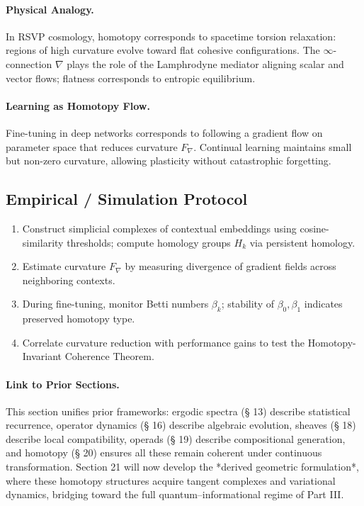 \documentclass[12pt,a4paper,twoside,openright]{book}
\begin{document}
\paragraph{Physical Analogy.}
In RSVP cosmology, homotopy corresponds to spacetime torsion relaxation: regions of high curvature evolve toward flat cohesive configurations.  
The $\infty$-connection $\nabla$ plays the role of the Lamphrodyne mediator aligning scalar and vector flows; flatness corresponds to entropic equilibrium.

\paragraph{Learning as Homotopy Flow.}
Fine-tuning in deep networks corresponds to following a gradient flow on parameter space that reduces curvature $F_\nabla$.  
Continual learning maintains small but non-zero curvature, allowing plasticity without catastrophic forgetting.

\subsection*{Empirical / Simulation Protocol}

\begin{enumerate}
\item Construct simplicial complexes of contextual embeddings using cosine-similarity thresholds; compute homology groups $H_k$ via persistent homology.
\item Estimate curvature $F_\nabla$ by measuring divergence of gradient fields across neighboring contexts.
\item During fine-tuning, monitor Betti numbers $\beta_k$; stability of $\beta_0,\beta_1$ indicates preserved homotopy type.
\item Correlate curvature reduction with performance gains to test the Homotopy-Invariant Coherence Theorem.
\end{enumerate}

\paragraph{Link to Prior Sections.}
This section unifies prior frameworks:  
ergodic spectra (§ 13) describe statistical recurrence,  
operator dynamics (§ 16) describe algebraic evolution,  
sheaves (§ 18) describe local compatibility,  
operads (§ 19) describe compositional generation,  
and homotopy (§ 20) ensures all these remain coherent under continuous transformation.  
Section 21 will now develop the *derived geometric formulation*, where these homotopy structures acquire tangent complexes and variational dynamics, bridging toward the full quantum–informational regime of Part III.
\end{document}

